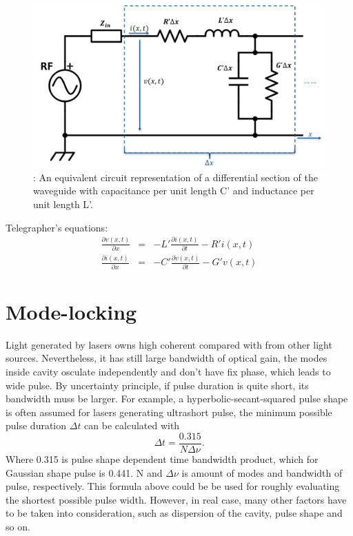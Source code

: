 \documentclass[11pt,final]{scrbook}
\begin{document}
\begin{figure}[htbp]
\begin{center}
\includegraphics[scale=0.4]{images/TLcircuit}
\caption{: An equivalent circuit representation of a differential section of the waveguide with capacitance per unit length C’ and inductance per unit length L’.}
\label{fig:TLcircuit}
\end{center}
\end{figure}
Telegrapher's equations:
\begin{eqnarray}
\frac { \partial v(x,t) }{ \partial x }  &=& -L'\frac { \partial i(x,t) }{ \partial t }-R'i(x,t) \label{eq:TLequation1}\\
\frac { \partial i(x,t) }{ \partial x }  &=& - C'\frac { \partial v(x,t) }{ \partial t }-G'v(x,t) \label{eq:TLequation2}
\end{eqnarray}

\section{Mode-locking}
Light generated by lasers owns high coherent compared with from other light sources. Nevertheless, it has still large bandwidth of optical gain, the modes inside cavity osculate independently and don't have fix phase, which leads to wide pulse. By uncertainty principle, if pulse duration is quite short, its bandwidth muss be larger. For example, a hyperbolic-secant-squared pulse shape is often assumed for lasers generating ultrashort pulse, the minimum possible pulse duration $\Delta t$ can be calculated with
\begin{equation}
\Delta t=\frac{0.315}{N\Delta \nu}.
\end{equation}
Where 0.315  is pulse shape dependent time bandwidth product, which for Gaussian shape pulse is 0.441. N and $\Delta \nu$ is amount of modes and bandwidth of pulse, respectively. This formula above could be be used for roughly evaluating the shortest possible pulse width. However, in real case, many other factors have to be taken into consideration, such as dispersion of the cavity, pulse shape and so on.
\end{document}
